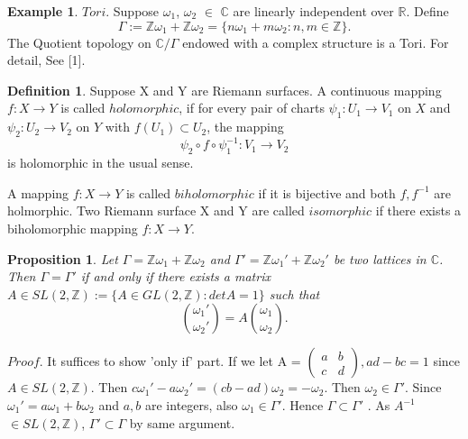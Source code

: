 \documentclass[11pt]{amsart}
\newtheorem{prop}[thm]{Proposition}
\theoremstyle{definition}
\newtheorem{exmp}[thm]{Example}
\newtheorem{defn}[thm]{Definition}
\begin{document}
\begin{exmp} $Tori$. Suppose $\omega_1$, $\omega_2$ $\in$ $\mathbb{C}$ are linearly independent over $\mathbb{R}$. Define 
\begin{equation*} \Gamma := \mathbb{Z}\omega_1 + \mathbb{Z}\omega_2 = \{n\omega_1 + m\omega_2 : n,m \in \mathbb{Z} \}.
\end{equation*}  
The Quotient topology on $ \mathbb{C}/\Gamma $ endowed with a complex structure is a Tori. For detail, See [1].
\end{exmp}

\begin{defn}
Suppose X and Y are Riemann surfaces. A continuous mapping $f: X \to Y$ is called $holomorphic$, if for every pair of charts $\psi_1 : U_1 \to V_1$ on $X$ and $\psi_2 : U_2 \to V_2$ on $Y$ with $f(U_1) \subset U_2$, the mapping \begin{equation*} \psi_2 \circ f \circ \psi_1^{-1} : V_1 \to V_2
\end{equation*} is holomorphic in the usual sense.

A mapping $f: X \to Y$ is called $biholomorphic$ if it is bijective and both $f,f^{-1}$ are holmorphic. Two Riemann surface X and Y are called $isomorphic$ if there exists a biholomorphic mapping $f:X \to Y$.
\end{defn}
\begin{prop} Let $\Gamma = \mathbb{Z}\omega_1 + \mathbb{Z}\omega_2$ and $\Gamma' = \mathbb{Z}\omega_1' + \mathbb{Z}\omega_2'$ be two lattices in $\mathbb{C}$. Then $\Gamma = \Gamma'$ if and only if there exists a matrix $A \in SL(2,\mathbb{Z}) := \{A \in GL(2,\mathbb{Z}):det A=1 \}$ such that 
\begin{equation*} { \omega_1' \choose \omega_2'} = A { \omega_1 \choose \omega_2}.
\end{equation*}
\end{prop}

$Proof$. It suffices to show 'only if' part. If we let A = $\begin{pmatrix} a & b \\ c & d \end{pmatrix}, ad-bc=1$ since $A \in SL(2,\mathbb{Z})$. Then $c\omega_1' - a\omega_2' = (cb-ad)\omega_2=-\omega_2$. Then $\omega_2 \in \Gamma'$. Since $\omega_1' = a\omega_1+b\omega_2$ and $a,b$ are integers, also $\omega_1  \in \Gamma'$.  Hence $ \Gamma \subset \Gamma'$ . As $A^{-1}$ $\in SL(2,\mathbb{Z})$, $\Gamma' \subset \Gamma$ by same argument.

\vspace{2ex}
\end{document}
